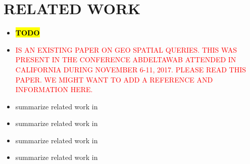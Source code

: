 \chapter{RELATED WORK}
\label{sect:rword}
\begin{itemize}

\item \large \textcolor{red}{\textbf{\hl{TODO}}}
\item \textcolor{red}{\textbfTHERE IS AN EXISTING PAPER ON GEO SPATIAL QUERIES. THIS WAS PRESENT IN THE  CONFERENCE ABDELTAWAB ATTENDED IN CALIFORNIA DURING NOVEMBER 6-11, 2017. PLEASE READ THIS PAPER. WE MIGHT WANT TO ADD A REFERENCE AND INFORMATION HERE.}
\item summarize related work in \cite{Jeung08}
\item summarize related work in \cite{Huang08}
\item summarize related work in \cite{Cheng12}
\item summarize related work in \cite{Hendawi15} 
\end{itemize}